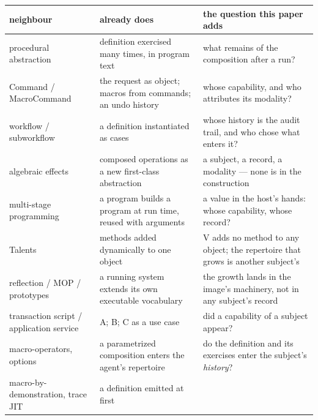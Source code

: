 \documentclass[
]{article}
\newcounter{none} %
\begin{document}
{\def\LTcaptype{none} %
\begin{longtable}[]{@{}
  >{\raggedright\arraybackslash}p{}
  >{\raggedright\arraybackslash}p{}
  >{\raggedright\arraybackslash}p{}@{}}
\toprule\noalign{}
\begin{minipage}[b]{\linewidth}\raggedright
neighbour
\end{minipage} & \begin{minipage}[b]{\linewidth}\raggedright
already does
\end{minipage} & \begin{minipage}[b]{\linewidth}\raggedright
the question this paper adds
\end{minipage} \\
\midrule\noalign{}
\endhead
\bottomrule\noalign{}
\endlastfoot
procedural abstraction & definition exercised many times, in program
text & what remains of the composition after a run? \\
Command / MacroCommand & the request as object; macros from commands; an
undo history & whose capability, and who attributes its modality? \\
workflow / subworkflow & a definition instantiated as cases & whose
history is the audit trail, and who chose what enters it? \\
algebraic effects & composed operations as a new first-class abstraction
& a subject, a record, a modality --- none is in the construction \\
multi-stage programming & a program builds a program at run time, reused
with arguments & a value in the host's hands: whose capability, whose
record? \\
Talents & methods added dynamically to one object & V adds no method to
any object; the repertoire that grows is another subject's \\
reflection / MOP / prototypes & a running system extends its own
executable vocabulary & the growth lands in the image's machinery, not
in any subject's record \\
transaction script / application service & A; B; C as a use case & did a
capability of a subject appear? \\
macro-operators, options & a parametrized composition enters the agent's
repertoire & do the definition and its exercises enter the subject's
\emph{history}? \\
macro-by-demonstration, trace JIT & a definition emitted at first

\end{longtable}}
\end{document}
